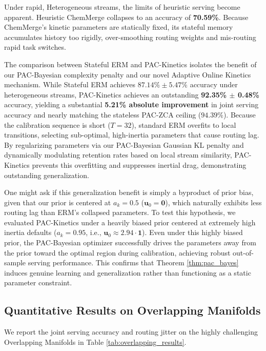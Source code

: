 Under rapid, Heterogeneous streams, the limits of heuristic serving become apparent. Heuristic ChemMerge collapses to an accuracy of \textbf{70.59\%}. Because ChemMerge's kinetic parameters are statically fixed, its stateful memory accumulates history too rigidly, over-smoothing routing weights and mis-routing rapid task switches. 

The comparison between Stateful ERM and PAC-Kinetics isolates the benefit of our PAC-Bayesian complexity penalty and our novel Adaptive Online Kinetics mechanism. While Stateful ERM achieves $87.14\% \pm 5.47\%$ accuracy under heterogeneous streams, PAC-Kinetics achieves an outstanding \textbf{92.35\% $\pm$ 0.48\%} accuracy, yielding a substantial \textbf{5.21\% absolute improvement} in joint serving accuracy and nearly matching the stateless PAC-ZCA ceiling ($94.39\%$). Because the calibration sequence is short ($T=32$), standard ERM overfits to local transitions, selecting sub-optimal, high-inertia parameters that cause routing lag. By regularizing parameters via our PAC-Bayesian Gaussian KL penalty and dynamically modulating retention rates based on local stream similarity, PAC-Kinetics prevents this overfitting and suppresses inertial drag, demonstrating outstanding generalization.

One might ask if this generalization benefit is simply a byproduct of prior bias, given that our prior is centered at $a_k = 0.5$ ($\mathbf{u}_0 = \mathbf{0}$), which naturally exhibits less routing lag than ERM's collapsed parameters. To test this hypothesis, we evaluated PAC-Kinetics under a heavily biased prior centered at extremely high inertia defaults ($a_k = 0.95$, i.e., $\mathbf{u}_0 \approx 2.94 \cdot \mathbf{1}$). Even under this highly biased prior, the PAC-Bayesian optimizer successfully drives the parameters away from the prior toward the optimal region during calibration, achieving robust out-of-sample serving performance. This confirms that Theorem \ref{thm:pac_bayes} induces genuine learning and generalization rather than functioning as a static parameter constraint.

\subsection{Quantitative Results on Overlapping Manifolds}
\label{sec:overlapping_results}

We report the joint serving accuracy and routing jitter on the highly challenging Overlapping Manifolds in Table \ref{tab:overlapping_results}.

